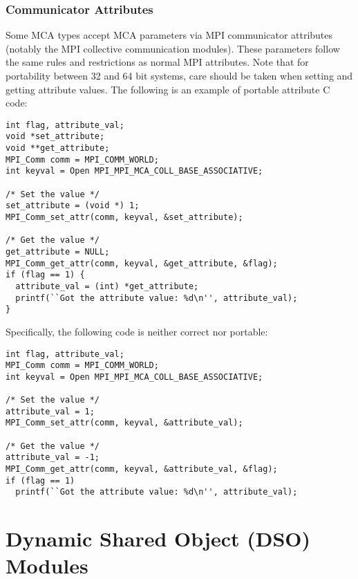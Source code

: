 
\subsubsection{Communicator Attributes}

Some MCA types accept MCA parameters via MPI communicator attributes
(notably the MPI collective communication modules).  These parameters
follow the same rules and restrictions as normal MPI attributes.  Note
that for portability between 32 and 64 bit systems, care should be
taken when setting and getting attribute values.  The following is an
example of portable attribute C code:

\lstset{style=lam-c}
\begin{lstlisting}
int flag, attribute_val;
void *set_attribute;
void **get_attribute;
MPI_Comm comm = MPI_COMM_WORLD;
int keyval = Open MPI_MPI_MCA_COLL_BASE_ASSOCIATIVE;

/* Set the value */
set_attribute = (void *) 1;
MPI_Comm_set_attr(comm, keyval, &set_attribute);

/* Get the value */
get_attribute = NULL;
MPI_Comm_get_attr(comm, keyval, &get_attribute, &flag);
if (flag == 1) {
  attribute_val = (int) *get_attribute;
  printf(``Got the attribute value: %d\n'', attribute_val);
}
\end{lstlisting}

Specifically, the following code is neither correct nor portable:

\lstset{style=lam-c}
\begin{lstlisting}
int flag, attribute_val;
MPI_Comm comm = MPI_COMM_WORLD;
int keyval = Open MPI_MPI_MCA_COLL_BASE_ASSOCIATIVE;

/* Set the value */
attribute_val = 1;
MPI_Comm_set_attr(comm, keyval, &attribute_val);

/* Get the value */
attribute_val = -1;
MPI_Comm_get_attr(comm, keyval, &attribute_val, &flag);
if (flag == 1)
  printf(``Got the attribute value: %d\n'', attribute_val);
\end{lstlisting}



\section{Dynamic Shared Object (DSO) Modules}

